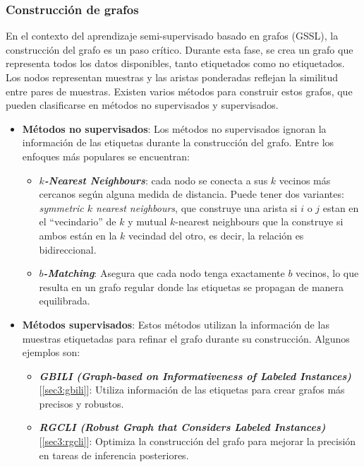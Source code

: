\subsubsection{Construcción de grafos}
En el contexto del aprendizaje semi-supervisado basado en grafos (GSSL), la construcción del grafo es un paso crítico. Durante esta fase, se crea un grafo que representa todos los datos disponibles, tanto etiquetados como no etiquetados. Los nodos representan muestras y las aristas ponderadas reflejan la similitud entre pares de muestras. Existen varios métodos para construir estos grafos, que pueden clasificarse en métodos no supervisados y supervisados.
\begin{itemize}
	\item \textbf{Métodos no supervisados}: Los métodos no supervisados ignoran la información de las etiquetas durante la construcción del grafo. Entre los enfoques más populares se encuentran:
	\begin{itemize}
		\item \textbf{\textit{$k$-Nearest Neighbours}}: cada nodo se conecta a sus $k$ vecinos más cercanos según alguna medida de distancia. Puede tener dos variantes: \textit{symmetric $k$ nearest neighbours}, que construye una arista si $i$ o $j$ estan en el ``vecindario'' de $k$ y mutual $k$-nearest neighbours que la construye si ambos están en la $k$ vecindad del otro, es decir, la relación es bidireccional.
		\item \textbf{\textit{$b$-Matching}}: Asegura que cada nodo tenga exactamente $b$ vecinos, lo que resulta en un grafo regular donde las etiquetas se propagan de manera equilibrada.
	\end{itemize}
	\item \textbf{Métodos supervisados}: Estos métodos utilizan la información de las muestras etiquetadas para refinar el grafo durante su construcción. Algunos ejemplos son:
	\begin{itemize}
		\item \textbf{\textit{GBILI (Graph-based on Informativeness of Labeled Instances)}} [\ref{sec3:gbili}]: Utiliza información de las etiquetas para crear grafos más precisos y robustos.
		\item \textbf{\textit{RGCLI (Robust Graph that Considers Labeled Instances)}} [\ref{sec3:rgcli}]: Optimiza la construcción del grafo para mejorar la precisión en tareas de inferencia posteriores.
	\end{itemize}
\end{itemize}

